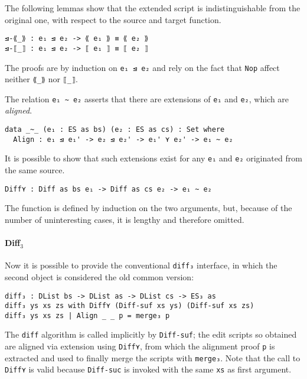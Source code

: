 \documentclass[../Thesis.tex]{subfiles}
\begin{document}
	The following lemmas show that the extended script is 
	indistinguishable from the original one, with respect to
	the source and target function.
	
\begin{verbatim}
⊴-⟪_⟫ : e₁ ⊴ e₂ -> ⟪ e₁ ⟫ ≡ ⟪ e₂ ⟫
⊴-⟦_⟧ : e₁ ⊴ e₂ -> ⟦ e₁ ⟧ ≡ ⟦ e₂ ⟧
\end{verbatim}

	The proofs are by induction on \texttt{e₁ ⊴ e₂} and rely on the fact that
	\texttt{Nop} affect neither \texttt{⟪\_⟫} nor \texttt{⟦\_⟧}.
	
	The relation \texttt{e₁ \textasciitilde\ e₂} asserts that there are
	extensions of \texttt{e₁} and \texttt{e₂}, which are \emph{aligned}.
	
\begin{verbatim}
data _~_ (e₁ : ES as bs) (e₂ : ES as cs) : Set where
  Align : e₁ ⊴ e₁' -> e₂ ⊴ e₂' -> e₁' ⋎ e₂' -> e₁ ~ e₂
\end{verbatim}
	
	It is possible to show that such extensions exist for any \texttt{e₁} 
	and \texttt{e₂} 	originated from the same source. 
	
\begin{verbatim}
Diff⋎ : Diff as bs e₁ -> Diff as cs e₂ -> e₁ ~ e₂
\end{verbatim}
	The function is defined by induction on the two arguments,
	but, because of the number of uninteresting cases, it is lengthy 
	and therefore omitted.

	\paragraph{Diff$_3$}
	Now it is possible to provide the conventional \texttt{diff₃} interface, in
	which the second object is considered the old common version:
\begin{verbatim}
diff₃ : DList bs -> DList as -> DList cs -> ES₃ as
diff₃ ys xs zs with Diff⋎ (Diff-suf xs ys) (Diff-suf xs zs)
diff₃ ys xs zs | Align _ _ p = merge₃ p
\end{verbatim}
	
	The \texttt{diff} algorithm is called implicitly by \texttt{Diff-suf}; the
	edit scripts so obtained are aligned via extension using 
	\texttt{Diff⋎}, from which the alignment proof \texttt{p} is extracted
	and used to finally merge the scripts with \texttt{merge₃}.
	Note that the call to \texttt{Diff⋎} is valid because \texttt{Diff-suc}
	is invoked with the same \texttt{xs} as first argument.
	
\end{document}
